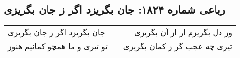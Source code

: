 \begin{center}
\section*{رباعی شماره ۱۸۲۴: جان بگریزد اگر ز جان بگریزی}
\label{sec:1824}
\begin{longtable}{l p{0.5cm} r}
جان بگریزد اگر ز جان بگریزی
&&
وز دل بگریزم ار از آن بگریزی
\\
تو تیری و ما همچو کمانیم هنوز
&&
تیری چه عجب گر ز کمان بگریزی
\\
\end{longtable}
\end{center}

